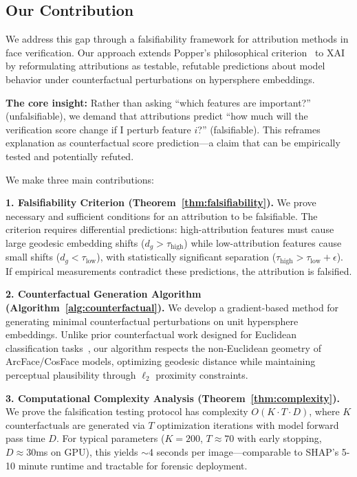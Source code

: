 \subsection{Our Contribution}

We address this gap through a falsifiability framework for attribution methods in face verification. Our approach extends Popper's philosophical criterion~\citep{popper1959logic} to XAI by reformulating attributions as testable, refutable predictions about model behavior under counterfactual perturbations on hypersphere embeddings.

\textbf{The core insight:} Rather than asking ``which features are important?'' (unfalsifiable), we demand that attributions predict ``how much will the verification score change if I perturb feature $i$?'' (falsifiable). This reframes explanation as counterfactual score prediction—a claim that can be empirically tested and potentially refuted.

We make three main contributions:

\noindent\textbf{1. Falsifiability Criterion (Theorem~\ref{thm:falsifiability}).} We prove necessary and sufficient conditions for an attribution to be falsifiable. The criterion requires differential predictions: high-attribution features must cause large geodesic embedding shifts ($d_g > \tau_{\text{high}}$) while low-attribution features cause small shifts ($d_g < \tau_{\text{low}}$), with statistically significant separation ($\tau_{\text{high}} > \tau_{\text{low}} + \epsilon$). If empirical measurements contradict these predictions, the attribution is falsified.

\noindent\textbf{2. Counterfactual Generation Algorithm (Algorithm~\ref{alg:counterfactual}).} We develop a gradient-based method for generating minimal counterfactual perturbations on unit hypersphere embeddings. Unlike prior counterfactual work designed for Euclidean classification tasks~\citep{wachter2017counterfactual,goyal2019counterfactual}, our algorithm respects the non-Euclidean geometry of ArcFace/CosFace models, optimizing geodesic distance while maintaining perceptual plausibility through $\ell_2$ proximity constraints.

\noindent\textbf{3. Computational Complexity Analysis (Theorem~\ref{thm:complexity}).} We prove the falsification testing protocol has complexity $O(K \cdot T \cdot D)$, where $K$ counterfactuals are generated via $T$ optimization iterations with model forward pass time $D$. For typical parameters ($K=200$, $T \approx 70$ with early stopping, $D \approx 30$ms on GPU), this yields $\sim$4 seconds per image—comparable to SHAP's 5-10 minute runtime and tractable for forensic deployment.

